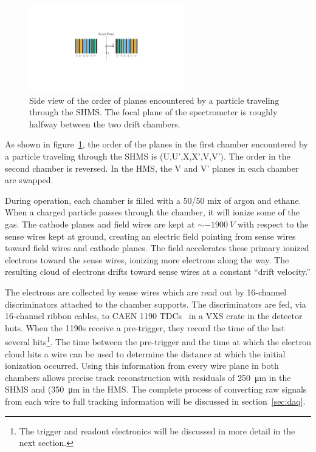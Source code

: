 \begin{figure}[!h]
    \centering
    \includegraphics[width=0.6\textwidth]{chap3/dc_plane_order.pdf}
    \caption{Side view of the order of planes encountered by a particle
             traveling through the SHMS. The focal plane of the spectrometer
             is roughly halfway between the two drift chambers.}
    \label{fig:shms_plane_order}
\end{figure}

As shown in figure~\ref{fig:shms_plane_order}, the order of the planes in the
first chamber encountered by a particle traveling through the SHMS is
(U,U',X,X',V,V').
The order in the second chamber is reversed.
In the HMS, the V and V' planes in each chamber are swapped.

During operation, each chamber is filled with a 50/50 mix of argon and ethane.
When a charged particle passes through the chamber, it will ionize some of
the gas.
The cathode planes and field wires are kept at $\sim-\SI{1900}{V}$ with respect
to the sense wires kept at ground, creating an electric field pointing from
sense wires toward field wires and cathode planes.
The field accelerates these primary ionized electrons toward the sense wires,
ionizing more electrons along the way.
The resulting cloud of electrons drifts toward sense wires at a
constant ``drift velocity.''

The electrons are collected by sense wires which are read out by
16-channel discriminators attached to the chamber supports.
The discriminators are fed, via 16-channel ribbon cables, to CAEN 1190
TDCs~\cite{CAEN_1190_manual} in a VXS crate in the detector huts.
When the 1190s receive a pre-trigger, they record the time of the last several
hits\footnote{The trigger and readout electronics will be discussed in more
detail in the next section.}.
The time between the pre-trigger and the time at which the electron cloud hits
a wire can be used to determine the distance at which the initial ionization
occurred.
Using this information from every wire plane in both chambers allows
precise track reconstruction with residuals of \SI{250}{\micro\meter} in the
SHMS and (\SI{350}{\micro\meter} in the HMS.
The complete process of converting raw signals from each wire to full tracking
information will be discussed in section~\ref{sec:daq}.

